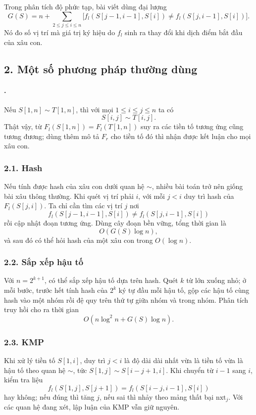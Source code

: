 \documentclass[11pt]{article}
\begin{document}
Trong phân tích độ phức tạp, bài viết dùng đại lượng
\[
  G(S)=n+\sum_{2\le j\le i\le n}
  \bigl[f_l(S[j-1,i-1],S[i])\ne f_l(S[j,i-1],S[i])\bigr].
\]
Nó đo số vị trí mà giá trị ký hiệu do \(f_l\) sinh ra thay đổi khi dịch điểm
bắt đầu của xâu con.

\subsection*{2. Một số phương pháp thường dùng}

\paragraph{.}
Nếu \(S[1,n]\sim T[1,n]\), thì với mọi \(1\le i\le j\le n\) ta có
\[
  S[i,j]\sim T[i,j].
\]
Thật vậy, từ \(F_l(S[1,n])=F_l(T[1,n])\) suy ra các tiền tố tương ứng cũng
tương đương; dùng thêm mô tả \(F_r\) cho tiền tố đó thì nhận được kết luận cho
mọi xâu con.

\subsubsection*{2.1. Hash}

Nếu tính được hash của xâu con dưới quan hệ \(\sim\), nhiều bài toán trở nên
giống bài xâu thông thường. Khi quét vị trí phải \(i\), với mỗi \(j<i\) duy
trì hash của \(F_l(S[j,i])\). Ta chỉ cần tìm các vị trí \(j\) nơi
\[
  f_l(S[j-1,i-1],S[i])\ne f_l(S[j,i-1],S[i])
\]
rồi cập nhật đoạn tương ứng. Dùng cây đoạn bền vững, tổng thời gian là
\[
  O(G(S)\log n),
\]
và sau đó có thể hỏi hash của một xâu con trong \(O(\log n)\).

\subsubsection*{2.2. Sắp xếp hậu tố}

Với \(n=2^{k+1}\), có thể sắp xếp hậu tố dựa trên hash. Quét \(k\) từ lớn xuống
nhỏ; ở mỗi bước, trước hết tính hash của \(2^k\) ký tự đầu mỗi hậu tố, gộp các
hậu tố cùng hash vào một nhóm rồi đệ quy trên thứ tự giữa nhóm và trong nhóm.
Phân tích truy hồi cho ra thời gian
\[
  O(n\log^2 n+G(S)\log n).
\]

\subsubsection*{2.3. KMP}

Khi xử lý tiền tố \(S[1,i]\), duy trì \(j<i\) là độ dài dài nhất vừa là tiền tố
vừa là hậu tố theo quan hệ \(\sim\), tức \(S[1,j]\sim S[i-j+1,i]\). Khi chuyển
từ \(i-1\) sang \(i\), kiểm tra liệu
\[
  f_l(S[1,j],S[j+1])=f_l(S[i-j,i-1],S[i])
\]
hay không; nếu đúng thì tăng \(j\), nếu sai thì nhảy theo mảng thất bại
\(\mathrm{nxt}_j\). Với các quan hệ đang xét, lập luận của KMP vẫn giữ nguyên.
\end{document}
